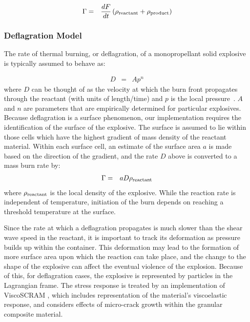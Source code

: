 \begin{eqnarray}
\Gamma&=&{dF \over dt}  \left(\rho_{\text{reactant}}+\rho_{\text{product}}\right)
\end{eqnarray}

\subsubsection{Deflagration Model}\label{sec:deflagration}

The rate of thermal burning, or deflagration, of a monopropellant 
solid explosive is typically assumed to behave as:

\begin{eqnarray}
D&=&Ap^n
\label{deflagration_rate}
\end{eqnarray}
where $D$ can be thought of as the velocity at which the burn front 
propagates through the reactant (with units of length/time) and $p$ is the 
local pressure~\cite{Son2000}.  $A$ and $n$ are parameters that are 
empirically determined for particular explosives.  
Because deflagration is a 
surface phenomenon, our implementation requires the identification of the 
surface of the explosive.  The surface is assumed to lie within those cells 
which have the highest gradient of mass density of the reactant 
material.  Within each surface cell, an estimate of the surface area $a$
is made based on the direction of the gradient, and the rate $D$ above 
is converted to a mass burn rate by:
\begin{eqnarray}
\Gamma&=&a D \rho_{\text{reactant}}
\label{deflagration_mass_rate}
\end{eqnarray}
where $\rho_{\text{reactant}}$ is the local density of the explosive.  While the reaction 
rate is independent of temperature, initiation of the burn depends 
on reaching a threshold temperature at the surface.

Since the rate at which a deflagration propagates is much slower than the 
shear wave speed in the reactant, it is important to track its deformation 
as pressure builds up within the container.  This deformation may lead to 
the formation of more surface area upon which the reaction can take place, and 
the change to the shape of the explosive can affect the eventual violence of the
explosion.  Because of this, for deflagration cases, the explosive is 
represented by particles in the Lagrangian frame.  The stress response is 
treated by an implementation of ViscoSCRAM \cite{Hackett2000Viscoscram}, which includes 
representation of the material's viscoelastic response, and considers effects 
of micro-crack growth within the granular composite material.

